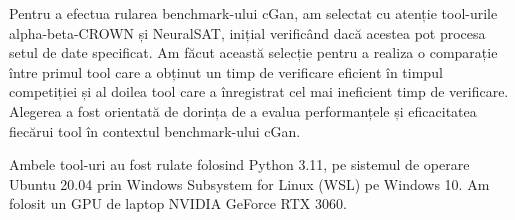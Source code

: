 Pentru a efectua rularea benchmark-ului cGan, am selectat cu atenție tool-urile alpha-beta-CROWN și NeuralSAT, inițial verificând dacă acestea pot procesa setul de date specificat. Am făcut această selecție pentru a realiza o comparație între primul tool care a obținut un timp de verificare eficient în timpul competiției și al doilea tool care a înregistrat cel mai ineficient timp de verificare. Alegerea a fost orientată de dorința de a evalua performanțele și eficacitatea fiecărui tool în contextul benchmark-ului cGan.

Ambele tool-uri au fost rulate folosind Python 3.11,  pe sistemul de operare Ubuntu 20.04 prin Windows Subsystem for Linux (WSL) pe Windows 10. Am folosit un GPU de laptop NVIDIA GeForce RTX 3060.